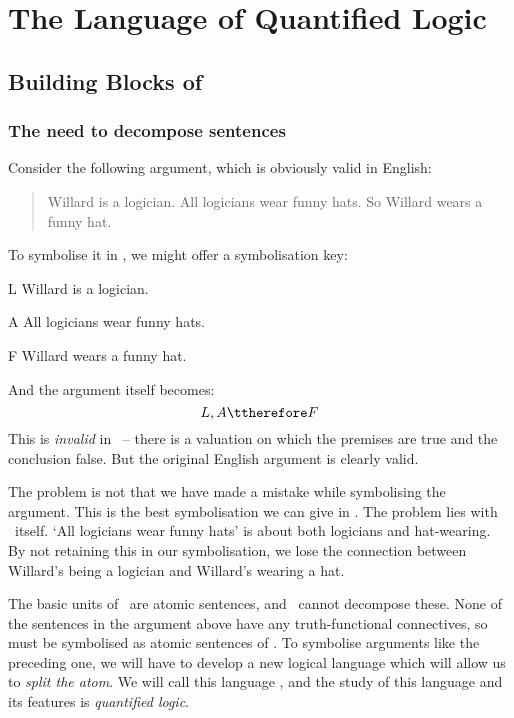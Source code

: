 \part{The Language of Quantified Logic}
\label{ch.FOL}
\chapter{Building Blocks of \textnormal{\FOL}}\label{s:FOLBuildingBlocks}
\section{The need to decompose sentences}
Consider the following argument, which is obviously valid in English:
\begin{quote}
\label{willard1}
Willard is a logician. All logicians wear funny hats. So Willard wears a funny hat.
\end{quote}
To symbolise it in \TFL, we might offer a symbolisation key:
\begin{ekey}
\item[L] Willard is a logician.
\item[A] All logicians wear funny hats.
\item[F] Willard wears a funny hat.
\end{ekey}
And the argument itself becomes:
$$L, A \ttherefore F$$
This is \emph{invalid} in \TFL\ – there is a valuation on which the premises are true and the conclusion false. But the original English argument is clearly valid.

The problem is not that we have made a mistake while symbolising the argument. This is the best symbolisation we can give in \TFL. The problem lies with \TFL\ itself. `All logicians wear funny hats' is about both logicians and hat-wearing. By not retaining this in our symbolisation, we lose the connection between Willard's being a logician and Willard's wearing a hat.

The basic units of \TFL\ are atomic sentences, and \TFL\ cannot decompose these. None of the sentences in the argument above have any truth-functional connectives, so must be symbolised as atomic sentences of \TFL. To symbolise arguments like the preceding one, we will have to develop a new logical language which will allow us to \emph{split the atom}. We will call this language \FOL, and the study of this language and its features is \emph{quantified logic}. 


